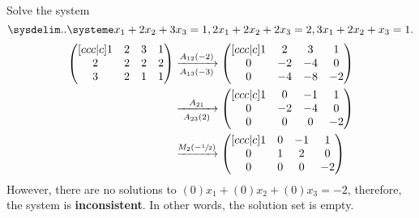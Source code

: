 \begin{example}
    Solve the system
    \[
        \linsys{
            x_1+2x_2+3x_3=1,
            2x_1+2x_2+2x_3=2,
            3x_1+2x_2+x_3=1
        }
        .
    \]
    \begin{align*}
        \begin{pmatrix}[ccc|c]
            1&2&3&1\\
            2&2&2&2\\
            3&2&1&1\\
        \end{pmatrix}
        &\eroarrow{A_{12}(-2)}{A_{13}(-3)}
        \begin{pmatrix}[ccc|c]
            1&2&3&1\\
            0&-2&-4&0\\
            0&-4&-8&-2\\
        \end{pmatrix}
        \\
        &\eroarrow{A_{21}}{A_{23}(2)}
        \begin{pmatrix}[ccc|c]
            1&0&-1&1\\
            0&-2&-4&0\\
            0&0&0&-2\\
        \end{pmatrix}
        \\
        &\eroarrow{M_{2}(-\sfrac12)}{}
        \begin{pmatrix}[ccc|c]
            1&0&-1&1\\
            0&1&2&0\\
            0&0&0&-2\\
        \end{pmatrix}
        \\
    \end{align*}
    However, there are no solutions to $(0)x_1+(0)x_2+(0)x_3=-2$, therefore, the system is \textbf{inconsistent}. In other words, the solution set is empty.
\end{example}

